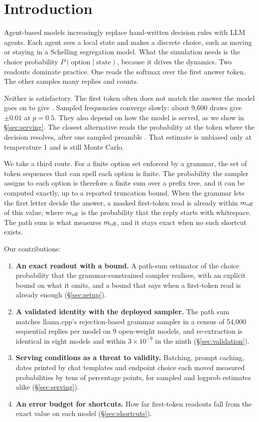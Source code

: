 \section{Introduction}

Agent-based models increasingly replace hand-written decision rules with LLM agents.
Each agent sees a local state and makes a discrete choice, such as moving or staying in a Schelling segregation model.
What the simulation needs is the choice probability $P(\text{option}\mid\text{state})$, because it drives the dynamics.
Two readouts dominate practice.
One reads the softmax over the first answer token.
The other samples many replies and counts.

Neither is satisfactory.
The first token often does not match the answer the model goes on to give \citep{wang2024myanswer,wang2024lookattext,lyu2024beyond}.
Sampled frequencies converge slowly: about 9,600 draws give $\pm0.01$ at $p=0.5$.
They also depend on how the model is served, as we show in \S\ref{sec:serving}.
The closest alternative reads the probability at the token where the decision resolves, after one sampled preamble \citep{sun2025choice}.
That estimate is unbiased only at temperature 1 and is still Monte Carlo.

We take a third route.
For a finite option set enforced by a grammar, the set of token sequences that can spell each option is finite.
The probability the sampler assigns to each option is therefore a finite sum over a prefix tree, and it can be computed exactly, up to a reported truncation bound.
When the grammar lets the first letter decide the answer, a masked first-token read is already within $m_{\text{off}}$ of this value, where $m_{\text{off}}$ is the probability that the reply starts with whitespace.
The path sum is what measures $m_{\text{off}}$, and it stays exact when no such shortcut exists.

Our contributions:
\begin{enumerate}[leftmargin=*,itemsep=2pt]
  \item \textbf{An exact readout with a bound.} A path-sum estimator of the choice probability that the grammar-constrained sampler realises, with an explicit bound on what it omits, and a bound that says when a first-token read is already enough (\S\ref{sec:setup}).
  \item \textbf{A validated identity with the deployed sampler.} The path sum matches llama.cpp's rejection-based grammar sampler in a census of 54,000 sequential replies per model on 9 open-weight models, and re-extraction is identical in eight models and within $3\times10^{-9}$ in the ninth (\S\ref{sec:validation}).
  \item \textbf{Serving conditions as a threat to validity.} Batching, prompt caching, dates printed by chat templates and endpoint choice each moved measured probabilities by tens of percentage points, for sampled and logprob estimates alike (\S\ref{sec:serving}).
  \item \textbf{An error budget for shortcuts.} How far first-token readouts fall from the exact value on each model (\S\ref{sec:shortcuts}).
\end{enumerate}

